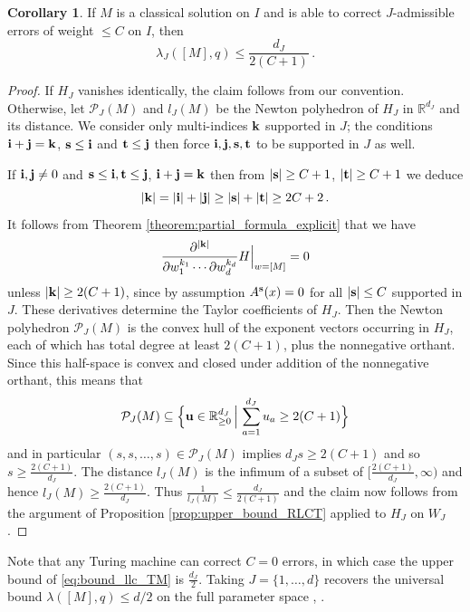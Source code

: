 \documentclass[english,letter paper,12pt,reqno]{article}
\theoremstyle{definition}
\newtheorem{corollary}[theorem]{Corollary}
\def\be{\begin{equation}}
\def\ee{\end{equation}}
\begin{document}
\begin{corollary}\label{corollary:bound_llc_TM} If $M$ is a classical solution on $I$ and is able to correct $J$-admissible errors of weight $\le C$ on $I$, then
\be\label{eq:bound_llc_TM}
\lambda_J([M], q) \le \frac{d_J}{2(C+1)}\,.
\ee
\end{corollary}
\begin{proof}
If $H_J$ vanishes identically, the claim follows from our convention. Otherwise, let $\mathcal{P}_J(M)$ and $l_J(M)$ be the Newton polyhedron of $H_J$ in $\mathbb{R}^{d_J}$ and its distance. We consider only multi-indices $\bold{k}$ supported in $J$; the conditions $\bold{i}+\bold{j}=\bold{k}$, $\bold{s}\le\bold{i}$ and $\bold{t}\le\bold{j}$ then force $\bold{i},\bold{j},\bold{s},\bold{t}$ to be supported in $J$ as well.

If $\bold{i}, \bold{j} \neq 0$ and $\bold{s} \le \bold{i}, \bold{t} \le \bold{j}$, $\bold{i} + \bold{j} = \bold{k}$ then from $|\bold{s}| \ge C+1$, $|\bold{t}| \ge C+1$ we deduce
\[
|\bold{k}| = |\bold{i}| + |\bold{j}| \ge |\bold{s}| + |\bold{t}| \ge 2C+2\,.
\]
It follows from Theorem \ref{theorem:partial_formula_explicit} that we have
\[
\frac{\partial^{|\bold{k}|}}{ \partial w_1^{k_1} \cdots \partial w_d^{k_d}} H \Bigr|_{w = [M]} = 0
\]
unless $|\bold{k}| \ge 2(C + 1)$, since by assumption $A^{\bold{s}}(x) = 0$ for all $|\bold{s}| \le C$ supported in $J$. These derivatives determine the Taylor coefficients of $H_J$. Then the Newton polyhedron $\mathcal{P}_J(M)$ is the convex hull of the exponent vectors occurring in $H_J$, each of which has total degree at least $2(C+1)$, plus the nonnegative orthant. Since this half-space is convex and closed under addition of the nonnegative orthant, this means that
\[
\mathcal{P}_J(M) \subseteq \Big\{ \bold{u}\in\mathbb{R}_{\ge 0}^{d_J} \,\Big|\, \sum_{a=1}^{d_J}u_a \ge 2(C + 1) \Big\}
\]
and in particular $(s,s,\ldots,s) \in \mathcal{P}_J(M)$ implies $d_Js \ge 2(C + 1)$ and so $s \ge \frac{2(C+1)}{d_J}$. The distance $l_J(M)$ is the infimum of a subset of $[\frac{2(C+1)}{d_J}, \infty)$ and hence $l_J(M) \ge \frac{2(C+1)}{d_J}$. Thus $\frac{1}{l_J(M)} \le \frac{d_J}{2(C+1)}$ and the claim now follows from the argument of Proposition \ref{prop:upper_bound_RLCT} applied to $H_J$ on $W_J$.
\end{proof}

Note that any Turing machine can correct $C = 0$ errors, in which case the upper bound of \eqref{eq:bound_llc_TM} is $\frac{d_J}{2}$. Taking $J=\{1,\ldots,d\}$ recovers the universal bound $\lambda([M],q)\le d/2$ on the full parameter space \cite[\S 7]{watanabeAlgebraicGeometryStatistical2009}, \cite[\S 4.2.3]{lin2011algebraic}.
\end{document}
